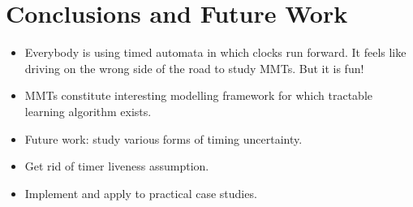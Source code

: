 \section{Conclusions and Future Work}
\begin{itemize}
\item
Everybody is using timed automata in which clocks run forward. It feels like driving on the wrong side of the road to study MMTs. But it is fun!
\item
MMTs constitute interesting modelling framework for which tractable learning algorithm exists.
\item
Future work: study various forms of timing uncertainty.
\item
Get rid of timer liveness assumption.
\item
Implement and apply to practical case studies.
\end{itemize}
